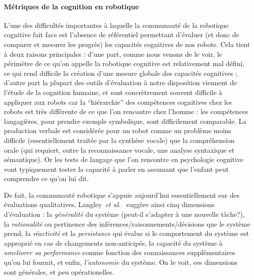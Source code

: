 \documentclass[a4paper]{article}
\newcommand{\etal}{{\textit{et al.~}}}
\begin{document}
\paragraph{Métriques de la cognition en robotique}

L'une des difficultés importantes à laquelle la communauté de la robotique
cognitive fait face est l'absence de référentiel permettant d'évaluer (et donc
de comparer et mesurer les progrès) les capacités cognitives de nos robots.
Cela tient à deux raisons principales : d'une part, comme nous venons de le
voir, le périmètre de ce qu'on appelle la robotique cognitive est relativement
mal défini, ce qui rend difficile la création d'une mesure globale des capacités
cognitives ; d'autre part la plupart des outils d'évaluation à notre disposition
viennent de l'étude de la cognition humaine, et sont concrètrement souvent
difficile à appliquer aux robots car la ``hiérarchie'' des compétences
cognitives chez les robots est très différente de ce que l'on rencontre chez
l'homme : les compétences langagières, pour prendre exemple symbolique, sont
difficilement comparable. La production verbale est considérée pour un robot
comme un problème moins difficile (essentiellement traitée par la synthèse
vocale) que la compréhension orale (qui requiert, outre la reconnaissance
vocale, une analyse syntaxique et sémantique). Or les tests de langage que l'on
rencontre en psychologie cognitive vont typiquement tester la capacité à parler
en assumant que l'enfant peut comprendre ce qu'on lui dit.

De fait, la communauté robotique s'appuie aujourd'hui essentiellement sur des
évaluations qualitatives. Langley~\etal\cite{Langley2006} suggère ainsi cinq
dimensions d'évaluation : la \emph{généralité} du système (peut-il s'adapter à
une nouvelle tâche?), la \emph{rationalité} ou pertinence des
inférences/raisonnements/décisions que le système prend, la \emph{réactivité} et
la \emph{persistance} qui évalue si le comportement du système est approprié en
cas de changements non-anticipés, la capacité du système à \emph{ameliorer sa
performance} comme fonction des connaissances supplémentaires qu'on lui fournit,
et enfin, \emph{l'autonomie} du système. On le voit, ces dimensions sont
générales, et peu opérationelles.
\end{document}
